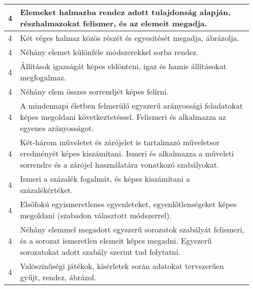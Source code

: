 \begin{longtable}{c | p{12cm} }
                                
                                          4 &  Elemeket halmazba rendez adott tulajdonság alapján, részhalmazokat felismer, és az elemeit megadja. \\ \hline
                                          4 &  Két véges halmaz közös részét és egyesítését megadja, ábrázolja. \\ \hline
                                          4 &  Néhány elemet különféle módszerekkel sorba rendez. \\ \hline
                                          4 &  Állítások igazságát képes eldönteni, igaz és hamis állításokat megfogalmaz. \\ \hline
                                          4 &  Néhány elem összes sorrendjét képes felírni. \\ \hline
                                          4 &  A mindennapi életben felmerülő egyszerű arányossági feladatokat képes megoldani következtetéssel. Felismeri és alkalmazza az egyenes arányosságot. \\ \hline
                                          4 &  Két-három műveletet és zárójelet is tartalmazó műveletsor eredményét képes kiszámítani. Ismeri és alkalmazza a műveleti sorrendre és a zárójel használatára vonatkozó szabályokat. \\ \hline
                                          4 &  Ismeri a százalék fogalmát, és képes kiszámítani a százalékértéket. \\ \hline
                                          4 &  Elsőfokú egyismeretlenes egyenleteket, egyenlőtlenségeket képes megoldani (szabadon választott módszerrel). \\ \hline
                                          4 &  Néhány elemmel megadott egyszerű sorozatok szabályát felismeri, és a sorozat ismeretlen elemeit képes megadni. Egyszerű sorozatokat adott szabály szerint tud folytatni. \\ \hline
                                          4 &  Valószínűségi játékok, kísérletek során adatokat tervszerűen gyűjt, rendez, ábrázol. \\ \hline
                                      
                        \end{longtable}
            \clearpage

